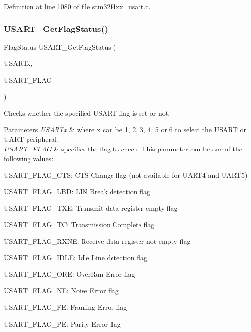 Definition at line 1080 of file stm32f4xx\+\_\+usart.\+c.

\mbox{\label{group___u_s_a_r_t_ga144630722defc9e312f0ad280b68e9da}} 
\subsubsection{\texorpdfstring{U\+S\+A\+R\+T\+\_\+\+Get\+Flag\+Status()}{USART\_GetFlagStatus()}}
{\footnotesize\ttfamily Flag\+Status U\+S\+A\+R\+T\+\_\+\+Get\+Flag\+Status (\begin{DoxyParamCaption}\item[{\hyperlink{struct_u_s_a_r_t___type_def}{U\+S\+A\+R\+T\+\_\+\+Type\+Def} $\ast$}]{U\+S\+A\+R\+Tx,  }\item[{uint16\+\_\+t}]{U\+S\+A\+R\+T\+\_\+\+F\+L\+AG }\end{DoxyParamCaption})}



Checks whether the specified U\+S\+A\+RT flag is set or not. 


\begin{DoxyParams}{Parameters}
{\em U\+S\+A\+R\+Tx} & where x can be 1, 2, 3, 4, 5 or 6 to select the U\+S\+A\+RT or U\+A\+RT peripheral. \\
\hline
{\em U\+S\+A\+R\+T\+\_\+\+F\+L\+AG} & specifies the flag to check. This parameter can be one of the following values\+: \begin{DoxyItemize}
\item U\+S\+A\+R\+T\+\_\+\+F\+L\+A\+G\+\_\+\+C\+TS\+: C\+TS Change flag (not available for U\+A\+R\+T4 and U\+A\+R\+T5) \item U\+S\+A\+R\+T\+\_\+\+F\+L\+A\+G\+\_\+\+L\+BD\+: L\+IN Break detection flag \item U\+S\+A\+R\+T\+\_\+\+F\+L\+A\+G\+\_\+\+T\+XE\+: Transmit data register empty flag \item U\+S\+A\+R\+T\+\_\+\+F\+L\+A\+G\+\_\+\+TC\+: Transmission Complete flag \item U\+S\+A\+R\+T\+\_\+\+F\+L\+A\+G\+\_\+\+R\+X\+NE\+: Receive data register not empty flag \item U\+S\+A\+R\+T\+\_\+\+F\+L\+A\+G\+\_\+\+I\+D\+LE\+: Idle Line detection flag \item U\+S\+A\+R\+T\+\_\+\+F\+L\+A\+G\+\_\+\+O\+RE\+: Over\+Run Error flag \item U\+S\+A\+R\+T\+\_\+\+F\+L\+A\+G\+\_\+\+NE\+: Noise Error flag \item U\+S\+A\+R\+T\+\_\+\+F\+L\+A\+G\+\_\+\+FE\+: Framing Error flag \item U\+S\+A\+R\+T\+\_\+\+F\+L\+A\+G\+\_\+\+PE\+: Parity Error flag \end{DoxyItemize}
\\
\hline
\end{DoxyParams}


